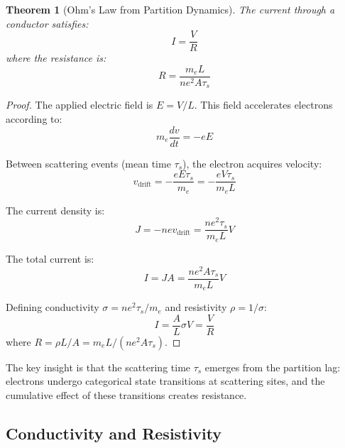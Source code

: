 \documentclass[twocolumn,showpacs,preprintnumbers,amsmath,amssymb,prd]{revtex4-2}
\newtheorem{theorem}{Theorem}[section]
\newcommand{\taus}{\tau_s}
\begin{document}
\begin{theorem}[Ohm's Law from Partition Dynamics]
\label{thm:ohm}
The current through a conductor satisfies:
\begin{equation}
I = \frac{V}{R}
\label{eq:ohm}
\end{equation}
where the resistance is:
\begin{equation}
R = \frac{m_e L}{n e^2 A \taus}
\label{eq:resistance}
\end{equation}
\end{theorem}

\begin{proof}
The applied electric field is $E = V/L$. This field accelerates electrons according to:
\begin{equation}
m_e \frac{dv}{dt} = -eE
\label{eq:acceleration}
\end{equation}

Between scattering events (mean time $\taus$), the electron acquires velocity:
\begin{equation}
v_{\text{drift}} = -\frac{eE\taus}{m_e} = -\frac{eV\taus}{m_e L}
\label{eq:drift_velocity}
\end{equation}

The current density is:
\begin{equation}
J = -nev_{\text{drift}} = \frac{ne^2 \taus}{m_e L} V
\label{eq:current_density}
\end{equation}

The total current is:
\begin{equation}
I = JA = \frac{ne^2 A \taus}{m_e L} V
\label{eq:current}
\end{equation}

Defining conductivity $\sigma = ne^2\taus/m_e$ and resistivity $\rho = 1/\sigma$:
\begin{equation}
I = \frac{A}{L} \sigma V = \frac{V}{R}
\end{equation}
where $R = \rho L/A = m_e L/(ne^2 A\taus)$.
\end{proof}

The key insight is that the scattering time $\taus$ emerges from the partition lag: electrons undergo categorical state transitions at scattering sites, and the cumulative effect of these transitions creates resistance.

\subsection{Conductivity and Resistivity}
\end{document}
